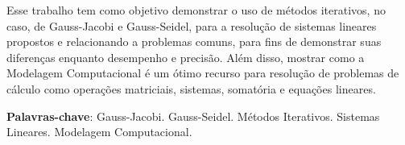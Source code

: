 \documentclass[
12pt,				%
openright,			%
twoside,			%
a4paper,			%
english,			%
french,				%
spanish,			%
brazil				%
]{abntex2_new}
\begin{document}
	
	
	
	\frenchspacing 
	
	
	\imprimircapa
	
	
	\imprimirfolhaderosto*
	
	
	\begin{fichacatalografica}
		\sffamily
		\vspace*{\fill}					%
		\begin{center}					%
			\end{center}
		\end{fichacatalografica}
		
		
		\clearpage
		
		\setlength{\absparsep}{18pt}
		\begin{resumo}
			Esse trabalho tem como objetivo demonstrar o uso de métodos iterativos,
			no caso, de Gauss-Jacobi e Gauss-Seidel, para a resolução de sistemas lineares
			propostos e relacionando a problemas comuns, para fins de demonstrar suas 
			diferenças enquanto desempenho e precisão. Além disso, mostrar como a
			Modelagem 
			Computacional é um ótimo recurso  para resolução de  problemas de cálculo 
			como operações matriciais, sistemas,
			somatória e equações lineares.
			
			\textbf{Palavras-chave}: Gauss-Jacobi. Gauss-Seidel. Métodos Iterativos.
			Sistemas Lineares. Modelagem Computacional.
		\end{resumo}
		
\end{document}
